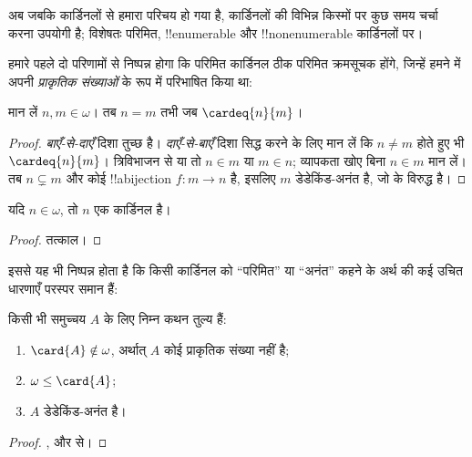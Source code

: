 \documentclass[../../../include/open-logic-section]{subfiles}
\begin{document}

अब जबकि कार्डिनलों से हमारा परिचय हो गया है, कार्डिनलों की विभिन्न
किस्मों पर कुछ समय चर्चा करना उपयोगी है; विशेषतः परिमित, !!{enumerable}
और !!{nonenumerable} कार्डिनलों पर।

हमारे पहले दो परिणामों से निष्पन्न होगा कि परिमित कार्डिनल ठीक परिमित
क्रमसूचक होंगे, जिन्हें हमने  में
अपनी \emph{प्राकृतिक संख्याओं} के रूप में परिभाषित किया था:

\begin{prop}
मान लें $n,m\in\omega$। तब $n=m$ तभी जब $\cardeq{n}{m}$।
\end{prop}

\begin{proof}
\emph{बाएँ-से-दाएँ} दिशा तुच्छ है। \emph{दाएँ-से-बाएँ} दिशा सिद्ध करने के
लिए मान लें कि $n\neq m$ होते हुए भी $\cardeq{n}{m}$। त्रिविभाजन से या तो
$n\in m$ या $m\in n$; व्यापकता खोए बिना $n\in m$ मान लें। तब
$n\subsetneq m$ और कोई !!a{bijection} $f\colon m\to n$ है, इसलिए $m$
डेडेकिंड-अनंत है, जो
 के विरुद्ध है।
\end{proof}

\begin{cor}
यदि $n\in\omega$, तो $n$ एक कार्डिनल है।
\end{cor}

\begin{proof}
तत्काल।
\end{proof}
\noindent
इससे यह भी निष्पन्न होता है कि किसी कार्डिनल को ``परिमित'' या ``अनंत'' कहने
के अर्थ की कई उचित धारणाएँ परस्पर समान हैं:
\begin{thm}किसी भी समुच्चय $A$ के लिए निम्न कथन तुल्य हैं:
\begin{enumerate}
	\item{} $\card{A} \notin \omega$, अर्थात्
	$A$ कोई प्राकृतिक संख्या नहीं है;
	\item{} $\omega \leq \card{A}$;
	\item{} $A$ डेडेकिंड-अनंत है।
\end{enumerate}
\end{thm}

\begin{proof}
,
 और
 से।
\end{proof}
\end{document}
